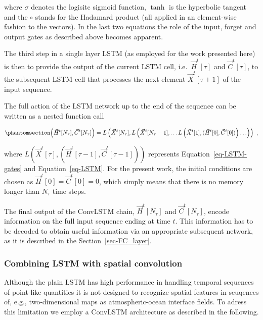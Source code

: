\documentclass[
]{agujournal2019}
\begin{document}
where \(\sigma\) denotes the logisitc sigmoid function, \(\tanh\) is the
hyperbolic tangent and the \(\circ\) stands for the Hadamard product
(all applied in an element-wise fashion to the vectors). In the last two
equations the role of the input, forget and output gates as described
above becomes apparent.

The third step in a single layer LSTM (as employed for the work
presented here) is then to provide the output of the current LSTM cell,
i.e.~\(\vec{H}^t[\tau]\) and \(\vec{C}^t[\tau]\), to the subsequent LSTM
cell that processes the next element \(\vec{X}^t[\tau+1]\) of the input
sequence.

The full action of the LSTM network up to the end of the sequence can be
written as a nested function call

\begin{equation}\phantomsection\label{eq-L_nested}{
\left(\vec{H}^t[N_\tau], \vec{C}^t[N_\tau] \right) = L \left( \vec{X}^t[N_\tau], L \left( \vec{X}^t[N_\tau-1], \ldots L \left( \vec{X}^t[1], (\vec{H}^t[0], \vec{C}^t[0]) \right) \ldots \right) \right) \ ,
}\end{equation}

where
\(L\left(\vec{X}^t[\tau], \left(\vec{H}^t[\tau-1], \vec{C}^t[\tau-1] \right) \right)\)
represents Equation~\ref{eq-LSTM-gates} and Equation~\ref{eq-LSTM}. For
the present work, the initial conditions are chosen as
\(\vec{H}^t[0]=\vec{C}^t[0]=0\), which simply means that there is no
memory longer than \(N_\tau\) time steps.

The final output of the ConvLSTM chain, \(\vec{H}^t[N_\tau]\) and
\(\vec{C}^t[N_\tau]\), encode information on the full input sequence
ending at time \(t\). This information has to be decoded to obtain
useful information via an appropriate subsequent network, as it is
described in the Section~\ref{sec-FC_layer}.

\subsubsection{Combining LSTM with spatial
convolution}\label{combining-lstm-with-spatial-convolution}

Although the plain LSTM has high performance in handling temporal
sequences of point-like quantities it is not designed to recognize
spatial features in seuqences of, e.g., two-dimensional maps as
atmospheric-ocean interface fields. To adress this limitation we employ
a ConvLSTM architecture as described in the following.
\end{document}
